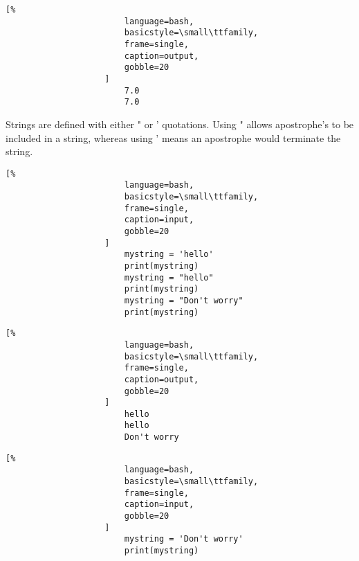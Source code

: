 \documentclass[crop=false,class=book,oneside]{standalone}
\begin{document}
                \hfill
                \begin{minipage}[t]{.48\textwidth}
                    \centering
                    \begin{lstlisting}[%
                        language=bash,
                        basicstyle=\small\ttfamily,
                        frame=single,
                        caption=output,
                        gobble=20
                    ]
                        7.0
                        7.0
                    \end{lstlisting}
                \end{minipage}
                Strings are defined with either " or ' quotations.
                Using " allows apostrophe's to be included
                in a string, whereas using ' means an apostrophe
                would terminate the string.\newline
                \begin{minipage}[t]{.48\textwidth}
                    \centering
                    \begin{lstlisting}[%
                        language=bash,
                        basicstyle=\small\ttfamily,
                        frame=single,
                        caption=input,
                        gobble=20
                    ]
                        mystring = 'hello'
                        print(mystring)
                        mystring = "hello"
                        print(mystring)
                        mystring = "Don't worry"
                        print(mystring)
                    \end{lstlisting}
                \end{minipage}\hfill
                \begin{minipage}[t]{.48\textwidth}
                    \centering
                    \begin{lstlisting}[%
                        language=bash,
                        basicstyle=\small\ttfamily,
                        frame=single,
                        caption=output,
                        gobble=20
                    ]
                        hello
                        hello
                        Don't worry
                    \end{lstlisting}
                \end{minipage}
                \begin{minipage}[t]{.48\textwidth}
                    \centering
                    \begin{lstlisting}[%
                        language=bash,
                        basicstyle=\small\ttfamily,
                        frame=single,
                        caption=input,
                        gobble=20
                    ]
                        mystring = 'Don't worry'
                        print(mystring)
                    \end{lstlisting}
                \end{minipage}\hfill
\end{document}
